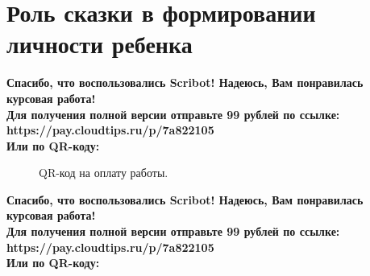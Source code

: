 \documentclass{article}
\begin{document}
\section{Роль сказки в формировании личности ребенка}
\begin{center}
    \textbf{
        Спасибо, что воспользовались Scribot! Надеюсь, Вам понравилась курсовая работа!\\
        Для получения полной версии отправьте 99 рублей по ссылке:\\
        https://pay.cloudtips.ru/p/7a822105\\
        Или по QR-коду:\\
    }
\end{center}
\begin{figure}[h]
    \caption{QR-код на оплату работы.}
    \label{ris:image}
\end{figure}
\newpage
\begin{center}
    \textbf{
        Спасибо, что воспользовались Scribot! Надеюсь, Вам понравилась курсовая работа!\\
        Для получения полной версии отправьте 99 рублей по ссылке:\\
        https://pay.cloudtips.ru/p/7a822105\\
        Или по QR-коду:\\
    }
\end{center}
\end{document}
